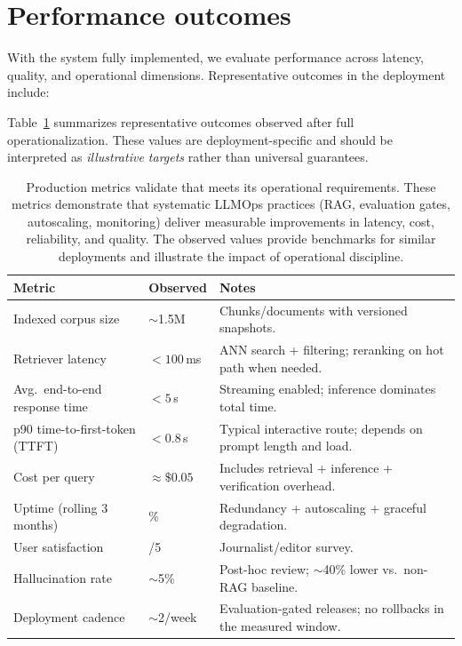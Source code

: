 \section{Performance outcomes}
\label{sec:ishtar-perf}

With the system fully implemented, we evaluate performance across latency, quality, and operational dimensions.
Representative outcomes in the \ishtar{} deployment include:

Table~\ref{tab:ch12_ishtar_metrics} summarizes representative outcomes observed after full operationalization.
These values are deployment-specific and should be interpreted as \emph{illustrative targets} rather than universal guarantees.

\begin{table}[t]
\centering
\small
\caption{Production metrics validate that \ishtar{} meets its operational requirements. These metrics demonstrate that systematic LLMOps practices (RAG, evaluation gates, autoscaling, monitoring) deliver measurable improvements in latency, cost, reliability, and quality. The observed values provide benchmarks for similar deployments and illustrate the impact of operational discipline.}
\label{tab:ch12_ishtar_metrics}
\setlength{\tabcolsep}{6pt}
\renewcommand{\arraystretch}{1.3}
\begin{tabularx}{0.95\linewidth}{@{}>{\raggedright\arraybackslash}p{46mm}>{\raggedright\arraybackslash}X>{\raggedright\arraybackslash}X@{}}
\toprule
\rowcolor{gray!15}
\textbf{Metric} & \textbf{Observed} & \textbf{Notes} \\
\midrule
Indexed corpus size & $\sim$1.5M & Chunks/documents with versioned snapshots. \\
Retriever latency & $<100$\,ms & ANN search + filtering; reranking on hot path when needed. \\
Avg.\ end-to-end response time & $<5$\,s & Streaming enabled; inference dominates total time. \\
p90 time-to-first-token (TTFT) & $<0.8$\,s & Typical interactive route; depends on prompt length and load. \\
Cost per query & $\approx\$0.05$ & Includes retrieval + inference + verification overhead. \\
Uptime (rolling 3 months) & 99.8\% & Redundancy + autoscaling + graceful degradation. \\
User satisfaction & 4.3/5 & Journalist/editor survey. \\
Hallucination rate & $\sim$5\% & Post-hoc review; $\sim$40\% lower vs.\ non-RAG baseline. \\
Deployment cadence & $\sim$2/week & Evaluation-gated releases; no rollbacks in the measured window. \\
\bottomrule
\end{tabularx}
\end{table}

